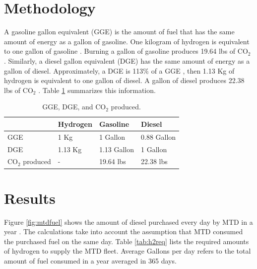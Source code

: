 \documentclass{anstrans}
\begin{document}
\section{Methodology}
\label{method}

A gasoline gallon equivalent (GGE) is the amount of fuel that has the same amount of energy as a gallon of gasoline. One kilogram of hydrogen is equivalent to one gallon of gasoline \cite{noauthor_hydrogen_nodate}. Burning a gallon of gasoline produces 19.64 lbs of CO$_2$ \cite{noauthor_how_2014}. 
Similarly, a diesel gallon equivalent (DGE) has the same amount of energy as a gallon of diesel. Approximately, a DGE is 113\% of a GGE \cite{noauthor_fuel_2014}, then 1.13 Kg of hydrogen is equivalent to one gallon of diesel.
A gallon of diesel produces 22.38 lbs of CO$_2$ \cite{noauthor_how_2014}. 
Table \ref{tab:meth} summarizes this information.

\begin{table}[!h]
	\centering
    \caption{GGE, DGE, and CO$_2$ produced.}
    \label{tab:meth}
	\begin{tabular}{l|lll}
	\hline
	                 & Hydrogen & Gasoline    & Diesel      \\ \hline
	GGE              & 1 Kg     & 1 Gallon    & 0.88 Gallon \\
	DGE              & 1.13 Kg  & 1.13 Gallon & 1 Gallon    \\
    CO$_2$ produced  & -        & 19.64 lbs   & 22.38 lbs   \\ \hline

	\end{tabular}
\end{table}

\section{Results}

Figure \ref{fig:mtdfuel} shows the amount of diesel purchased every day by MTD in a year \cite{mtd_irecords_2019}. The calculations take into account the assumption that MTD consumed the purchased fuel on the same day.
Table \ref{tab:h2req} lists the required amounts of hydrogen to supply the MTD fleet. Average Gallons per day refers to the total amount of fuel consumed in a year averaged in 365 days. 
\end{document}
